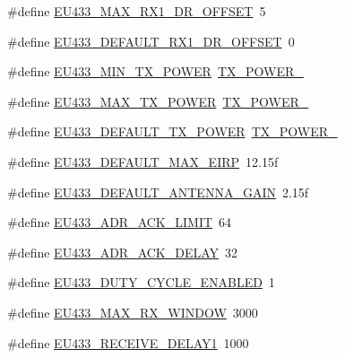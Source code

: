 \begin{DoxyCompactItemize}
\item 
\#define \hyperlink{group__REGIONEU433_gaea252feca5f849ceb5d54ce51c90cab8}{E\+U433\+\_\+\+M\+A\+X\+\_\+\+R\+X1\+\_\+\+D\+R\+\_\+\+O\+F\+F\+S\+ET}~5
\item 
\#define \hyperlink{group__REGIONEU433_ga0e7f38f989f846d6abcf94eb74e19fc0}{E\+U433\+\_\+\+D\+E\+F\+A\+U\+L\+T\+\_\+\+R\+X1\+\_\+\+D\+R\+\_\+\+O\+F\+F\+S\+ET}~0
\item 
\#define \hyperlink{group__REGIONEU433_gadb49eb1bda0c5ae6b68eb817bf4d4810}{E\+U433\+\_\+\+M\+I\+N\+\_\+\+T\+X\+\_\+\+P\+O\+W\+ER}~\hyperlink{group__REGION_ga0149d52581db80901b5bc1adf0aedd1d}{T\+X\+\_\+\+P\+O\+W\+E\+R\+\_}
\item 
\#define \hyperlink{group__REGIONEU433_gaac93ce9446f1e4b5c3c09c9b2ebf2297}{E\+U433\+\_\+\+M\+A\+X\+\_\+\+T\+X\+\_\+\+P\+O\+W\+ER}~\hyperlink{group__REGION_gab33618449f2a573142c463ab071ef8ed}{T\+X\+\_\+\+P\+O\+W\+E\+R\+\_}
\item 
\#define \hyperlink{group__REGIONEU433_gaeaf055dbd3b7262349329b190254bcae}{E\+U433\+\_\+\+D\+E\+F\+A\+U\+L\+T\+\_\+\+T\+X\+\_\+\+P\+O\+W\+ER}~\hyperlink{group__REGION_gab33618449f2a573142c463ab071ef8ed}{T\+X\+\_\+\+P\+O\+W\+E\+R\+\_}
\item 
\#define \hyperlink{group__REGIONEU433_ga6011f60777820105e69f17467f75f960}{E\+U433\+\_\+\+D\+E\+F\+A\+U\+L\+T\+\_\+\+M\+A\+X\+\_\+\+E\+I\+RP}~12.\+15f
\item 
\#define \hyperlink{group__REGIONEU433_gaecef7360c6c42e48c5a6f7a856511c3c}{E\+U433\+\_\+\+D\+E\+F\+A\+U\+L\+T\+\_\+\+A\+N\+T\+E\+N\+N\+A\+\_\+\+G\+A\+IN}~2.\+15f
\item 
\#define \hyperlink{group__REGIONEU433_ga3e1ccf1b708f6851ff62811ee58bb37e}{E\+U433\+\_\+\+A\+D\+R\+\_\+\+A\+C\+K\+\_\+\+L\+I\+M\+IT}~64
\item 
\#define \hyperlink{group__REGIONEU433_ga197b292bfc46b531e2d42a9e24f2fa0b}{E\+U433\+\_\+\+A\+D\+R\+\_\+\+A\+C\+K\+\_\+\+D\+E\+L\+AY}~32
\item 
\#define \hyperlink{group__REGIONEU433_gace175cf02edd563e039993cdfd8464cf}{E\+U433\+\_\+\+D\+U\+T\+Y\+\_\+\+C\+Y\+C\+L\+E\+\_\+\+E\+N\+A\+B\+L\+ED}~1
\item 
\#define \hyperlink{group__REGIONEU433_ga2ea8a5b5b652197dc7f9ad1de0bd199b}{E\+U433\+\_\+\+M\+A\+X\+\_\+\+R\+X\+\_\+\+W\+I\+N\+D\+OW}~3000
\item 
\#define \hyperlink{group__REGIONEU433_ga5280859658cfa8062200badd1c1cd469}{E\+U433\+\_\+\+R\+E\+C\+E\+I\+V\+E\+\_\+\+D\+E\+L\+A\+Y1}~1000
\item 

\end{DoxyCompactItemize}

